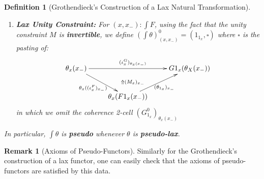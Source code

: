\documentclass{article}
\numberwithin{equation}{section}
\theoremstyle{definition}
\newtheorem{remark}[equation]{Remark}
\theoremstyle{plain}
\newtheorem{definition}[equation]{Definition}
\begin{document}
\begin{definition}[Grothendieck's Construction of a Lax Natural Transformation]
\begin{enumerate}
\[{{				&&&&\theta_z(F(g\circ f)(x_-)) \ar[urr]_{(\theta_{g\circ f})_{x_-}}
		}}\]
		in which we omit some coherence 2-cells linked to the pseudo-functoriality of $\theta_z$, and we omit the coherence 2-cell $(G^0_{g\circ f})_{\theta_x(x_-)}$
		\item  \textbf{Lax Unity Constraint:} For $(x,x_-):\int F$, using the fact that the unity constraint $M$ is \textbf{invertible}, we define $(\int \theta)^0_{(x,x_-)} =  (1_{1_x}, \square)$ where $\square$ is the pasting of:
		\[\xymatrix{
			\theta_x(x_-) \ar@{}[drr]|{\Uparrow (M_x)_{x_-}} \ar[rr]^{(\iota^G_x)_{\theta_x(x_-)}} \ar[dr]_{\theta_x((\iota^F_x)_{x_-})} && G1_x(\theta_X(x_-))\\
			& \theta_x(F1_x(x_-)) \ar[ur]_{(\theta_{1_x})_{x_-}} &
		}\]
		in which we omit the coherence 2-cell $(G^0_{1_x})_{\theta_x(x_-)}$
	\end{enumerate}
	In particular, $\int \theta$ is \textbf{pseudo} whenever $\theta$ is \textbf{pseudo-lax}.
\end{definition}

\begin{remark}[Axioms of Pseudo-Functors] Similarly for the Grothendieck's construction of a lax functor, one can easily check that the axioms of pseudo-functors are satisfied by this data.
\end{remark}
\end{document}
